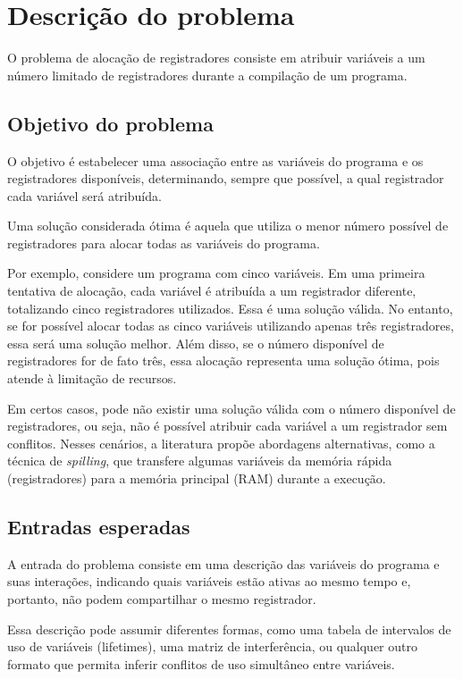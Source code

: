 \section{Descrição do problema}

O problema de alocação de registradores consiste em atribuir variáveis a um número limitado de registradores durante a compilação de um programa.

\subsection{Objetivo do problema}

O objetivo é estabelecer uma associação entre as variáveis do programa e os registradores disponíveis,
determinando, sempre que possível, a qual registrador cada variável será atribuída.

Uma solução considerada ótima é aquela que utiliza o menor número possível de registradores para
alocar todas as variáveis do programa.

Por exemplo, considere um programa com cinco variáveis. Em uma primeira tentativa de alocação, cada variável é atribuída
a um registrador diferente, totalizando cinco registradores utilizados. Essa é uma solução válida.
No entanto, se for possível alocar todas as cinco variáveis utilizando apenas três registradores,
essa será uma solução melhor. Além disso, se o número disponível de registradores for de fato três,
essa alocação representa uma solução ótima, pois atende à limitação de recursos.

Em certos casos, pode não existir uma solução válida com o número disponível de registradores, ou seja, não é possível
atribuir cada variável a um registrador sem conflitos. Nesses cenários, a literatura propõe abordagens alternativas,
como a técnica de \textit{spilling}, que transfere algumas variáveis da memória rápida (registradores) para
a memória principal (RAM) durante a execução.

\subsection{Entradas esperadas}


A entrada do problema consiste em uma descrição das variáveis do programa e suas interações,
indicando quais variáveis estão ativas ao mesmo tempo e, portanto, não podem compartilhar o mesmo registrador.

Essa descrição pode assumir diferentes formas, como uma tabela de intervalos de uso de variáveis (lifetimes),
uma matriz de interferência, ou qualquer outro formato que permita inferir conflitos de uso simultâneo entre variáveis.

